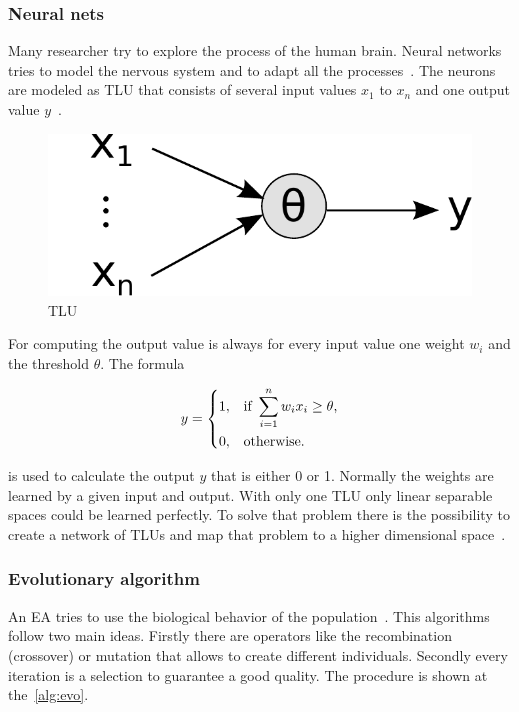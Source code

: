 \subsubsection{Neural nets} 
Many researcher try to explore the process of the human brain. Neural networks tries to model the nervous system and to adapt all the processes~\cite{nn_intro}. The neurons are modeled as \ac{TLU} that consists of several input values $x_1$ to $x_n$ and one output value $y$~\cite{ci_kruse}. 


\begin{figure}
\centering
\includegraphics[scale=0.5]{images/tlu.pdf}
\caption{\ac{TLU}~\cite{ci_kruse}}
\label{fig:tlu}
\end{figure}


For computing the output value is always for every input value one weight $w_i$ and the threshold $\theta$. The formula 

\begin{equation}
    y = 
\begin{dcases}
    1, & \text{if } \sum_{i=1}^n w_{i} x_{i} \geq \theta \text{,} \\
    0, & \text{otherwise.}
\end{dcases}
\end{equation}

is used to calculate the output $y$ that is either 0 or 1.
Normally the weights are learned by a given input and output. With only one \ac{TLU} only linear separable spaces could be learned perfectly.
To solve that problem there is the possibility to create a network of \acp{TLU} and map that problem to a higher dimensional space~\cite{ci_kruse}.


\subsubsection{Evolutionary algorithm} 
An \ac{EA} tries to use the biological behavior of the population~\cite{evo}. 
This algorithms follow two main ideas. Firstly there are operators like the recombination (crossover) or
mutation that allows to create different individuals. Secondly every iteration is a selection to guarantee
a good quality.
The procedure is shown at the~\cref{alg:evo}. 


